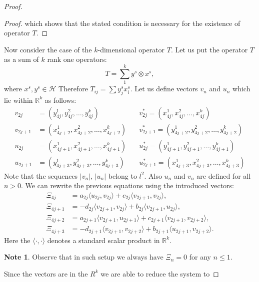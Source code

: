 \documentclass[12pt]{article}
\renewcommand{\cal}[1]{\mathcal{#1}}
\renewcommand{\leq}{\leqslant}
\theoremstyle{definition}
\newtheorem*{note}{Note}
\numberwithin{remark}{section}
\numberwithin{theorem}{section}
\numberwithin{prop}{section}
\numberwithin{equation}{section}
\numberwithin{lemma}{section}
\numberwithin{prop_under_lemma}{lemma}
\begin{document}
\begin{proof}
\begin{proof}
            which shows that the stated condition is necessary for the existence of operator $T$.
        \end{proof}
        Now consider the case of the $k$-dimensional operator $T$.
        Let us put the operator $T$ as a sum of $k$ rank one operators:
        $$
            T = \sum_1^k y^s \otimes x^s,
        $$
        where $x^s, y^s \in \cal{H}$
        Therefore $T_{ij} = \sum {y^s_j x^s_i}$.
        Let us define vectors $v_n$ and $u_n$ which lie within $\mathbb{R}^k$ as follows:
        \begin{align*}
            v_{2j} &= (y^1_{4j}, y^2_{4j}, \dots ,y^k_{4j}) \quad
            &v^*_{2j} = (x^1_{4j}, x^2_{4j}, \dots ,x^k_{4j}) \\
            v_{2j+1} &= (x^1_{4j+2}, x^2_{4j+2}, \dots ,x^k_{4j+2}) \quad
            &v^*_{2j+1} = (y^1_{4j+2}, y^2_{4j+2}, \dots ,y^k_{4j+2}) \\
            u_{2j} &= (x^1_{4j+1}, x^2_{4j+1}, \dots ,x^k_{4j+1}) \quad
            &u^*_{2j} = (y^1_{4j+1}, y^2_{4j+1}, \dots ,y^k_{4j+1}) \\
            u_{2j+1} &= (y^1_{4j+3}, y^2_{4j+3}, \dots ,y^k_{4j+3}) \quad
            &u^*_{2j+1} = (x^1_{4j+3}, x^2_{4j+3}, \dots ,x^k_{4j+3}) 
        \end{align*}
        Note that the sequences $|v_n|$, $|u_n|$ belong to $l^2$. Also $u_n$ and $v_n$ are defined for all $n > 0$.
        We can rewrite the previous equations using the introduced vectors:
        \begin{align*}
            \Xi_{4j} &= a_{2j} \langle u_{2j}, v_{2j}\rangle + c_{2j} \langle v_{2j+1}, v_{2j}\rangle,\\
            \Xi_{4j + 1} &= -d_{2j} \langle v_{2j+1}, v_{2j}\rangle + b_{2j} \langle v_{2j+1}, u_{2j}\rangle,\\
            \Xi_{4j + 2} &= a_{2j+1} \langle v_{2j+1}, u_{2j+1} \rangle + c_{2j+1} \langle v_{2j+1}, v_{2j+2} \rangle,\\
            \Xi_{4j + 3} &= -d_{2j+1} \langle v_{2j+1}, v_{2j+2}\rangle + b_{2j+1} \langle u_{2j+1}, v_{2j+2} \rangle.
        \end{align*}
        Here the $\langle\cdot, \cdot\rangle$ denotes a standard scalar product in $\mathbb{R}^k$.
        \begin{note}
        Observe that in such setup we always have $\Xi_n = 0$ for any $n \leq 1$.
        \end{note}
        Since the vectors are in the $R^k$ we are able to reduce the system to

\end{proof}
\end{document}
